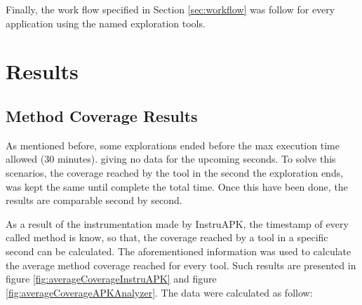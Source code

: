 \begin{table}[t]
	\centering
	\caption{Applications used for the study}
	\label{tab:apps}
\end{table}

Finally, the work flow specified in Section \ref{sec:workflow} was follow for every application using the named exploration tools. 

\section{Results}\label{sec:results}

\subsection{Method Coverage Results}\label{sec:coverageResults}

As mentioned before, some explorations ended before the max execution time allowed (30 minutes). giving no data for the upcoming seconds. To solve this scenarios, the coverage reached by the tool in the second the exploration ends, was kept the same until complete the total time. Once this have been done, the results are comparable second by second.


As a result of the instrumentation made by InstruAPK, the timestamp of every called method is know, so that, the coverage reached by a tool in a specific second can be calculated. The aforementioned information was used to calculate the average method coverage reached for every tool. Such results are presented in figure \ref{fig:averageCoverageInstruAPK} and figure \ref{fig:averageCoverageAPKAnalyzer}. The data were calculated as follow: 

